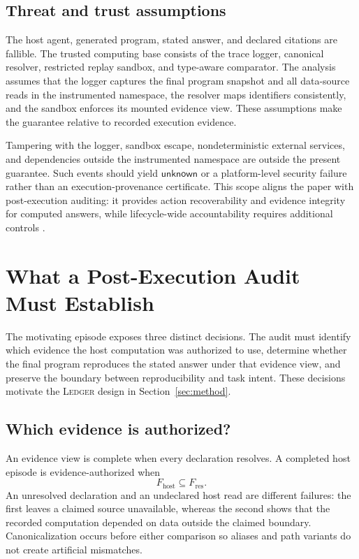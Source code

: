 \documentclass[5p,times]{elsarticle}
\newcommand{\ledger}{\textsc{Ledger}\xspace}
\newcommand{\unknown}{\mathsf{unknown}}
\begin{document}
\subsection{Threat and trust assumptions}\label{sec:threat}

The host agent, generated program, stated answer, and declared citations are fallible. The trusted computing base consists of the trace logger, canonical resolver, restricted replay sandbox, and type-aware comparator. The analysis assumes that the logger captures the final program snapshot and all data-source reads in the instrumented namespace, the resolver maps identifiers consistently, and the sandbox enforces its mounted evidence view. These assumptions make the guarantee relative to recorded execution evidence.

Tampering with the logger, sandbox escape, nondeterministic external services, and dependencies outside the instrumented namespace are outside the present guarantee. Such events should yield $\unknown$ or a platform-level security failure rather than an execution-provenance certificate. This scope aligns the paper with post-execution auditing: it provides action recoverability and evidence integrity for computed answers, while lifecycle-wide accountability requires additional controls \citep{nian2026auditable}.

\section{What a Post-Execution Audit Must Establish}\label{sec:requirements}

The motivating episode exposes three distinct decisions. The audit must identify which evidence the host computation was authorized to use, determine whether the final program reproduces the stated answer under that evidence view, and preserve the boundary between reproducibility and task intent. These decisions motivate the \ledger design in Section~\ref{sec:method}.

\subsection{Which evidence is authorized?}\label{sec:authorization}

An evidence view is complete when every declaration resolves. A completed host episode is evidence-authorized when
\[
F_{\mathrm{host}}\subseteq F_{\mathrm{res}}.
\]
An unresolved declaration and an undeclared host read are different failures: the first leaves a claimed source unavailable, whereas the second shows that the recorded computation depended on data outside the claimed boundary. Canonicalization occurs before either comparison so aliases and path variants do not create artificial mismatches.
\end{document}

